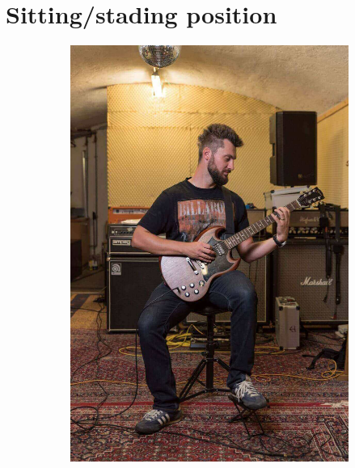 \section{Sitting/stading position}

\begin{figure}[h]
  \begin{subfigure}[b]{0.45\textwidth}
    \includegraphics[width=\textwidth]{image/Letty_Guitar-Shooting_sitting.jpg}
    \caption{}
    \label{fig:positin_sitting}
  \end{subfigure}
  \hfill
  \begin{subfigure}[b]{0.45\textwidth}

\end{subfigure}
\end{figure}
